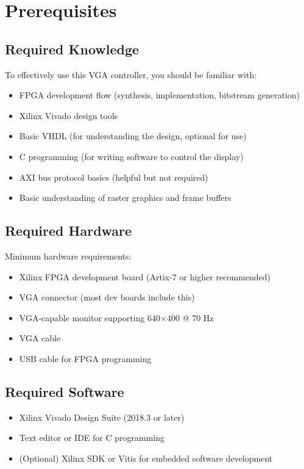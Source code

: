 \documentclass[11pt,letterpaper]{report}
\begin{document}
\section{Prerequisites}

\subsection{Required Knowledge}

To effectively use this VGA controller, you should be familiar with:

\begin{itemize}
    \item FPGA development flow (synthesis, implementation, bitstream generation)
    \item Xilinx Vivado design tools
    \item Basic VHDL (for understanding the design, optional for use)
    \item C programming (for writing software to control the display)
    \item AXI bus protocol basics (helpful but not required)
    \item Basic understanding of raster graphics and frame buffers
\end{itemize}

\subsection{Required Hardware}

Minimum hardware requirements:

\begin{itemize}
    \item Xilinx FPGA development board (Artix-7 or higher recommended)
    \item VGA connector (most dev boards include this)
    \item VGA-capable monitor supporting 640$\times$400 @ 70 Hz
    \item VGA cable
    \item USB cable for FPGA programming
\end{itemize}

\subsection{Required Software}

\begin{itemize}
    \item Xilinx Vivado Design Suite (2018.3 or later)
    \item Text editor or IDE for C programming
    \item (Optional) Xilinx SDK or Vitis for embedded software development
\end{itemize}
\end{document}
